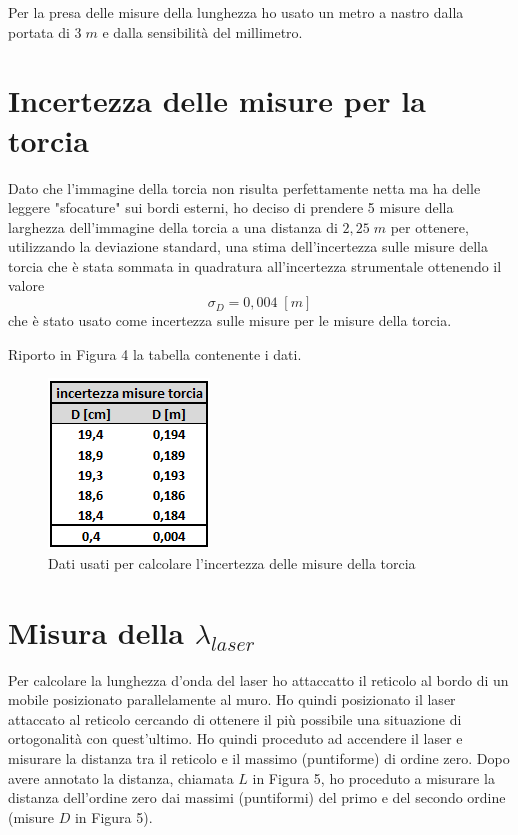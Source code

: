 \documentclass{article}
\begin{document}
\vspace{3mm}

Per la presa delle misure della lunghezza ho usato un metro a nastro dalla portata di $3 \; m$ e dalla sensibilità del millimetro.

\section{Incertezza delle misure per la torcia}
Dato che l'immagine della torcia non risulta perfettamente netta ma ha delle leggere "sfocature" sui bordi esterni, ho deciso di prendere 5 misure della larghezza dell'immagine della torcia a una distanza di $2,25 \; m$ per ottenere, utilizzando la deviazione standard, una stima dell'incertezza sulle misure della torcia che è stata sommata in quadratura all'incertezza strumentale ottenendo il valore
\[ \sigma_D = 0,004 \; [m]\]
che è stato usato come incertezza sulle misure per le misure della torcia.

\clearpage

Riporto in Figura 4 la tabella contenente i dati.

\begin{figure}[h!]
  \centering
  \includegraphics[width=0.25\linewidth]{IM tabella incertezza torcia}
  \caption{Dati usati per calcolare l'incertezza delle misure della torcia}
\end{figure}


\section{Misura della $\lambda_{laser}$}
Per calcolare la lunghezza d'onda del laser ho attaccatto il reticolo al bordo di un mobile posizionato parallelamente al muro. Ho quindi posizionato il laser attaccato al reticolo cercando di ottenere il più possibile una situazione di ortogonalità con quest'ultimo. Ho quindi proceduto ad accendere il laser e misurare la distanza tra il reticolo e il massimo (puntiforme) di ordine zero. Dopo avere annotato la distanza, chiamata $L$ in Figura 5, ho proceduto a misurare la distanza dell'ordine zero dai massimi (puntiformi) del primo e del secondo ordine (misure $D$ in Figura 5). 
\end{document}
